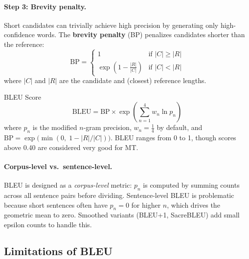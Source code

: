 \paragraph{Step 3: Brevity penalty.}
Short candidates can trivially achieve high precision by generating only
high-confidence words.  The \textbf{brevity penalty} (BP) penalizes candidates
shorter than the reference:
\[
    \text{BP} = \begin{cases}
        1 & \text{if } |C| \geq |R| \\[4pt]
        \exp\!\left(1 - \frac{|R|}{|C|}\right) & \text{if } |C| < |R|
    \end{cases}
\]
where $|C|$ and $|R|$ are the candidate and (closest) reference lengths.

\begin{mathresult}{BLEU Score}
\[
    \text{BLEU} = \text{BP} \times \exp\!\left(\sum_{n=1}^{4} w_n \ln p_n\right)
\]
where $p_n$ is the modified $n$-gram precision, $w_n = \tfrac{1}{4}$ by default,
and $\text{BP} = \exp\!\bigl(\min(0,\; 1 - |R|/|C|)\bigr)$.  BLEU ranges from
0 to 1, though scores above 0.40 are considered very good for MT.
\end{mathresult}

\paragraph{Corpus-level vs.\ sentence-level.}
BLEU is designed as a \emph{corpus-level} metric: $p_n$ is computed by summing
counts across all sentence pairs before dividing.  Sentence-level BLEU is
problematic because short sentences often have $p_n = 0$ for higher $n$, which
drives the geometric mean to zero.  Smoothed variants (BLEU+1, SacreBLEU) add
small epsilon counts to handle this.

\subsection{Limitations of BLEU}

